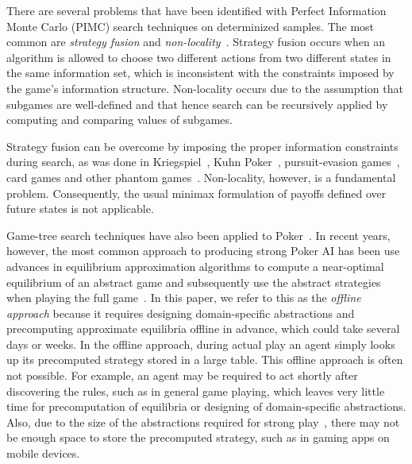 \documentclass[letterpaper]{article}
\begin{document}

There are several problems that have been identified with Perfect Information Monte Carlo (PIMC) search techniques
on determinized samples. The most common are {\it strategy fusion} and {\it non-locality}~\cite{Frank98Finding}.
Strategy fusion occurs when an algorithm is allowed to choose two different actions from two different states in the same 
information set, which is inconsistent with the constraints imposed by the game's information structure. 
Non-locality occurs due to the assumption that subgames are well-defined and that hence search can be 
recursively applied by computing and comparing values of subgames. 

Strategy fusion can be overcome by imposing the proper information constraints during search, as was done in 
Kriegspiel~\cite{Ciancarini10Kriegspiel}, Kuhn Poker~\cite{Ponsen11Computing}, pursuit-evasion games~\cite{Lisy12peg}, 
card games and other phantom games~\cite{Cowling12ISMCTS}. 
Non-locality, however, is a fundamental problem.
Consequently, the usual minimax formulation of payoffs defined over future states is not applicable.  







Game-tree search techniques have also been applied to Poker~\cite{Billings04Game}. In recent years, however, 
the most common approach to producing strong Poker AI has been use advances in equilibrium approximation 
algorithms to compute a near-optimal equilibrium of an abstract game and subsequently use the abstract strategies 
when playing the full game~\cite{Sandholm10The}. In this paper, we refer to this as the {\it offline approach} because it 
requires designing domain-specific abstractions and precomputing approximate equilibria offline in advance, which could take 
several days or weeks. In the offline approach, during actual play an agent simply looks up its precomputed strategy 
stored in a large table. 
This offline approach is often not possible. For example, an agent may be required to 
act shortly after discovering the rules, such as in general game playing, which leaves very little time for precomputation of 
equilibria or designing of domain-specific abstractions. 
Also, due to the size of the abstractions required for strong play~\cite{Johanson13Evaluating}, there may not be enough space to 
store the precomputed strategy, such as in gaming apps on mobile devices.
\end{document}
